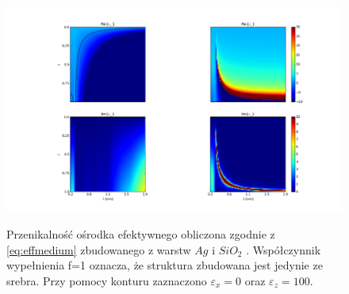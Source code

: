 \begin{figure}[tb]
	\includegraphics[width=1.5\textwidth]{images/multilayer/agsio2-effective.png}
	\label{fig:multiex}
	\caption{Przenikalność ośrodka efektywnego obliczona zgodnie z \ref{eq:effmedium}  zbudowanego z warstw $Ag$ \cite{PhysRevB.6.4370} i $SiO_2$ \cite{MALITSON:65}. Współczynnik wypełnienia f=1 oznacza, że struktura zbudowana jest jedynie ze srebra. Przy pomocy konturu zaznaczono $\varepsilon_x=0$ oraz $\varepsilon_z=100$.}
\end{figure}

